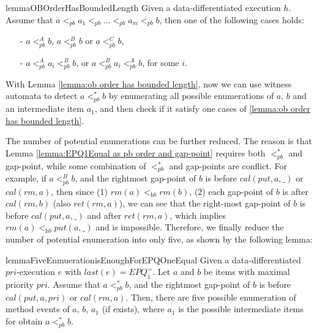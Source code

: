 \begin{restatable}{lemma}{OBOrderHasBoundedLength}
\label{lemma:ob order has bounded length}
Given a data-differentiated execution $h$. Assume that $a <_{\textit{pb}} a_1 <_{\textit{pb}} \ldots <_{\textit{pb}} a_m <_{\textit{pb}} b$, then one of the following cases holds:

\begin{itemize}
\setlength{\itemsep}{0.5pt}
\item[-] $a <_{\textit{pb}}^A b$, $a <_{\textit{pb}}^B b$ or $a <_{\textit{pb}}^C b$,

\item[-] $a <_{\textit{pb}}^A a_i <_{\textit{pb}}^B b$, or $a <_{\textit{pb}}^B a_i <_{\textit{pb}}^A b$, for some $i$.
\end{itemize}
\end{restatable}

With Lemma \ref{lemma:ob order has bounded length}, now we can use witness automata to detect $a <_{\textit{pb}}^* b$ by enumerating all possible enumerations of $a$, $b$ and an intermediate item $a_1$, and then check if it satisfy one cases of \ref{lemma:ob order has bounded length}.

The number of potential enumerations can be further reduced. The reason is that Lemma \ref{lemma:EPQ1Equal as pb order and gap-point} requires both $<_{\textit{pb}}^*$ and gap-point, while some combination of $<_{\textit{pb}}^*$ and gap-points are conflict. For example, if $a <_{\textit{pb}}^B b$, and the rightmost gap-point of $b$ is before $\textit{cal}(\textit{put},a,\_)$ or $\textit{cal}(\textit{rm},a)$, then since (1) $\textit{rm}(a) <_{\textit{hb}} \textit{rm}(b)$, (2) each gap-point of $b$ is after $\textit{cal}(\textit{rm},b)$ (also $\textit{ret}(\textit{rm},a)$), we can see that the right-most gap-point of $b$ is before $\textit{cal}(\textit{put},a,\_)$ and after $\textit{ret}(\textit{rm},a)$, which implies $\textit{rm}(a) <_{\textit{hb}} \textit{put}(a,\_)$ and is impossible. Therefore, we finally reduce the number of potential enumeration into only five, as shown by the following lemma:

\begin{restatable}{lemma}{FiveEnmuerationisEnoughForEPQOneEqual}
\label{lemma:five enumeration is enough for EPQ1Equal}
Given a data-differentiated $\textit{pri}$-execution $e$ with $\textit{last}(e) = \textit{EPQ}_1^{=}$. Let $a$ and $b$ be items with maximal priority $\textit{pri}$. Assume that $a <_{\textit{pb}}^* b$, and the rightmost gap-point of $b$ is before $\textit{cal}(\textit{put},a,\textit{pri})$ or $\textit{cal}(\textit{rm},a)$. Then, there are five possible enumeration of method events of $a$, $b$, $a_1$ (if exists), where $a_1$ is the possible intermediate items for obtain $a <_{\textit{pb}}^* b$.
\end{restatable}

